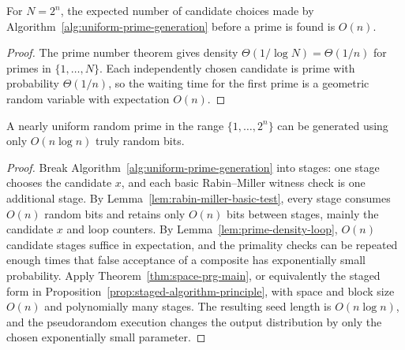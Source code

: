 \begin{lemma}
  \label{lem:prime-density-loop}
  For $N=2^n$, the expected number of candidate choices made by
  Algorithm~\ref{alg:uniform-prime-generation} before a prime is found is
  $O(n)$.
\end{lemma}
\begin{proof}
  The prime number theorem gives density $\Theta(1/\log N)=\Theta(1/n)$ for
  primes in $\{1,\ldots,N\}$. Each independently chosen candidate is prime
  with probability $\Theta(1/n)$, so the waiting time for the first prime is a
  geometric random variable with expectation $O(n)$.
\end{proof}

\begin{theorem}
  \label{thm:random-prime-low-randomness}
  A nearly uniform random prime in the range $\{1,\ldots,2^n\}$ can be
  generated using only $O(n\log n)$ truly random bits.
\end{theorem}
\begin{proof}
  Break Algorithm~\ref{alg:uniform-prime-generation} into stages: one stage
  chooses the candidate $x$, and each basic Rabin--Miller witness check is one
  additional stage. By Lemma~\ref{lem:rabin-miller-basic-test}, every stage
  consumes $O(n)$ random bits and retains only $O(n)$ bits between stages,
  mainly the candidate $x$ and loop counters. By Lemma~\ref{lem:prime-density-loop},
  $O(n)$ candidate stages suffice in expectation, and the primality checks can
  be repeated enough times that false acceptance of a composite has
  exponentially small probability. Apply Theorem~\ref{thm:space-prg-main}, or
  equivalently the staged form in Proposition~\ref{prop:staged-algorithm-principle},
  with space and block size $O(n)$ and polynomially many stages. The resulting
  seed length is $O(n\log n)$, and the pseudorandom execution changes the
  output distribution by only the chosen exponentially small parameter.
\end{proof}
